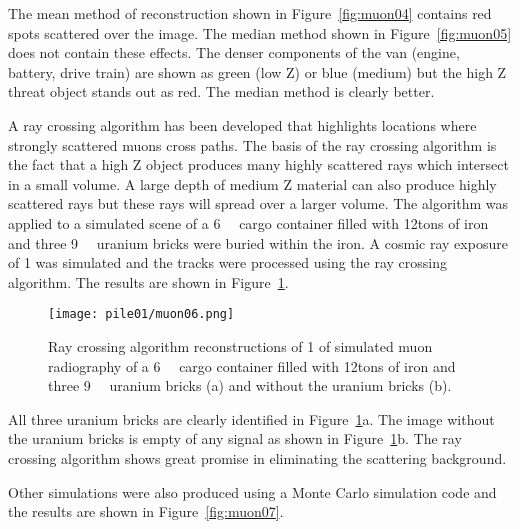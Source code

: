 \documentclass[twoside,titlepage,11pt,twocolumn,a4paper]{article}
\begin{document}
The mean method of reconstruction shown in Figure~\ref{fig:muon04}
contains red spots scattered over the image.  The median method shown
in Figure~\ref{fig:muon05} does not contain these effects. The denser
components of the van (engine, battery, drive train) are shown as
green (low Z) or blue (medium) but the high Z threat object stands out
as red. The median method is clearly
better. \citep{statisticalRec2007}

A ray crossing algorithm has been developed that highlights locations
where strongly scattered muons cross paths. The basis of the ray
crossing algorithm is the fact that a high Z object produces many
highly scattered rays which intersect in a small volume. A large depth
of medium Z material can also produce highly scattered rays but these
rays will spread over a larger volume. The algorithm was applied to a
simulated scene of a \unit{6}{\cubic\metre} cargo
container filled with \unit{12}{tons} of iron and three
\unit{9}{\cubic{\centi\metre}} uranium bricks were
buried within the iron. A cosmic ray exposure of \unit{1}{\minute} was
simulated and the tracks were processed using the ray crossing
algorithm. The results are shown in
Figure~\ref{fig:muon06}. \citep{imageRec2004}

\begin{figure}
  \texttt{[image: pile01/muon06.png]}
  \caption{Ray crossing algorithm reconstructions of \unit{1}{\minute}
    of simulated muon radiography of a
    \unit{6}{\cubic\metre} cargo container filled
    with \unit{12}{tons} of iron and three
    \unit{9}{\cubic{\centi\metre}} uranium bricks (a)
    and without the uranium bricks (b). \citep{imageRec2004}}
  \label{fig:muon06}
\end{figure}

All three uranium bricks are clearly identified in
Figure~\ref{fig:muon06}a. The image without the uranium bricks is
empty of any signal as shown in Figure~\ref{fig:muon06}b. The ray
crossing algorithm shows great promise in eliminating the scattering
background. \citep{imageRec2004}

Other simulations were also produced using a Monte Carlo simulation
code and the results are shown in Figure~\ref{fig:muon07}.
\end{document}
